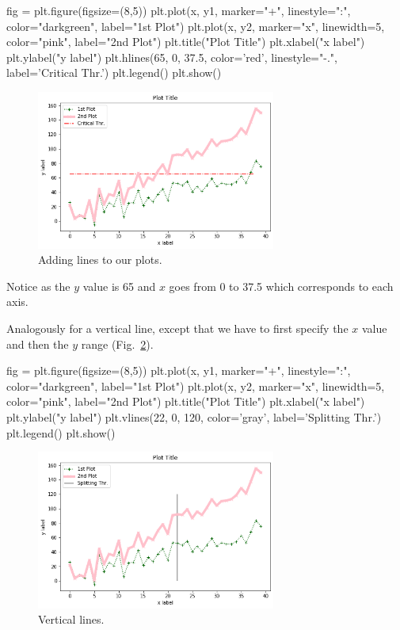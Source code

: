 \begin{ipython}
fig = plt.figure(figsize=(8,5))
plt.plot(x, y1, marker="+", linestyle=":", color="darkgreen", label="1st Plot")
plt.plot(x, y2, marker="x", linewidth=5, color="pink", label="2nd Plot")
plt.title("Plot Title")
plt.xlabel("x label")
plt.ylabel("y label")
plt.hlines(65, 0, 37.5, color='red', linestyle="-.", label='Critical Thr.')
plt.legend()
plt.show()
\end{ipython}

\begin{figure}[htb]
	\centering
	\includegraphics[width=0.7\textwidth]{figures/lines}
	\caption{Adding lines to our plots.}
	\label{fig:lines}
\end{figure}

Notice as the \(y\) value is 65 and \(x\) goes from 0 to 37.5 which corresponds to each axis.

Analogously for a vertical line, except that we have to first specify the \(x\) value and then the \(y\) range (Fig.~\ref{fig:lines2}).

\begin{ipython}
fig = plt.figure(figsize=(8,5))
plt.plot(x, y1, marker="+", linestyle=":", color="darkgreen", label="1st Plot")
plt.plot(x, y2, marker="x", linewidth=5, color="pink", label="2nd Plot")
plt.title("Plot Title")
plt.xlabel("x label")
plt.ylabel("y label")
plt.vlines(22, 0, 120, color='gray', label='Splitting Thr.')
plt.legend()
plt.show()
\end{ipython}

\begin{figure}[htb]
	\centering
	\includegraphics[width=0.7\textwidth]{figures/lines2}
	\caption{Vertical lines.}
	\label{fig:lines2}
\end{figure}

